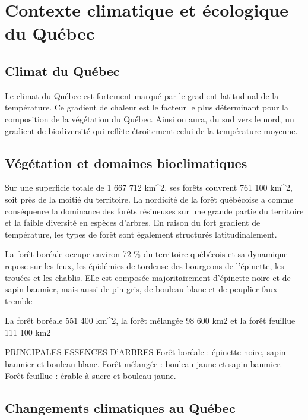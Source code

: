 \documentclass[
]{article}
\begin{document}
\hypertarget{contexte-climatique-et-uxe9cologique-du-quuxe9bec}{%
\section{Contexte climatique et écologique du
Québec}\label{contexte-climatique-et-uxe9cologique-du-quuxe9bec}}

\hypertarget{climat-du-quuxe9bec}{%
\subsection{Climat du Québec}\label{climat-du-quuxe9bec}}

Le climat du Québec est fortement marqué par le gradient latitudinal de
la température. Ce gradient de chaleur est le facteur le plus
déterminant pour la composition de la végétation du Québec. Ainsi on
aura, du sud vers le nord, un gradient de biodiversité qui reflète
étroitement celui de la température moyenne.

\hypertarget{vuxe9guxe9tation-et-domaines-bioclimatiques}{%
\subsection{Végétation et domaines
bioclimatiques}\label{vuxe9guxe9tation-et-domaines-bioclimatiques}}

Sur une superficie totale de 1 667 712 km\^{}2, ses forêts couvrent 761
100 km\^{}2, soit près de la moitié du territoire. La nordicité de la
forêt québécoise a comme conséquence la dominance des forêts résineuses
sur une grande partie du territoire et la faible diversité en espèces
d'arbres. En raison du fort gradient de température, les types de forêt
sont également structurés latitudinalement.

La forêt boréale occupe environ 72 \% du territoire québécois et sa
dynamique repose sur les feux, les épidémies de tordeuse des bourgeons
de l'épinette, les trouées et les chablis. Elle est composée
majoritairement d'épinette noire et de sapin baumier, mais aussi de pin
gris, de bouleau blanc et de peuplier faux-tremble

La forêt boréale 551 400 km\^{}2, la forêt mélangée 98 600 km2 et la
forêt feuillue 111 100 km2

PRINCIPALES ESSENCES D'ARBRES Forêt boréale : épinette noire, sapin
baumier et bouleau blanc. Forêt mélangée : bouleau jaune et sapin
baumier. Forêt feuillue : érable à sucre et bouleau jaune.

\hypertarget{changements-climatiques-au-quuxe9bec}{%
\subsection{Changements climatiques au
Québec}\label{changements-climatiques-au-quuxe9bec}}
\end{document}
